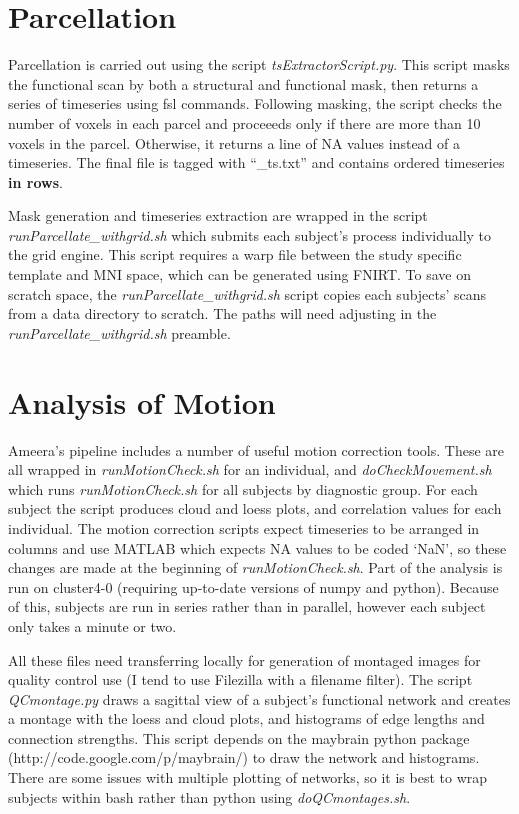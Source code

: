 \documentclass[a4paper,10pt]{article}
\begin{document}
\section{Parcellation}
Parcellation is carried out using the script \textit{tsExtractorScript.py}. This script masks the functional scan by both a structural and functional mask, then returns a series of timeseries using fsl commands. Following masking, the script checks the number of voxels in each parcel and proceeeds only if there are more than 10 voxels in the parcel. Otherwise, it returns a line of NA values instead of a timeseries. The final file is tagged with ``\_ts.txt'' and contains ordered timeseries \textbf{in rows}.

Mask generation and timeseries extraction are wrapped in the script \textit{runParcellate\_withgrid.sh} which submits each subject's process individually to the grid engine. This script requires a warp file between the study specific template and MNI space, which can be generated using FNIRT. To save on scratch space, the \textit{runParcellate\_withgrid.sh} script copies each subjects' scans from a data directory to scratch. The paths will need adjusting in the \textit{runParcellate\_withgrid.sh} preamble.

\section{Analysis of Motion}
Ameera's pipeline includes a number of useful motion correction tools. These are all wrapped in \textit{runMotionCheck.sh} for an individual, and \textit{doCheckMovement.sh} which runs \textit{runMotionCheck.sh} for all subjects by diagnostic group. For each subject the script produces cloud and loess plots, and correlation values for each individual. The motion correction scripts expect timeseries to be arranged in columns and use MATLAB which expects NA values to be coded `NaN', so these changes are made at the beginning of \textit{runMotionCheck.sh}. Part of the analysis is run on cluster4-0 (requiring up-to-date versions of numpy and python). Because of this, subjects are run in series rather than in parallel, however each subject only takes a minute or two.

All these files need transferring locally for generation of montaged images for quality control use (I tend to use Filezilla with a filename filter). The script \textit{QCmontage.py} draws a sagittal view of a subject's functional network and creates a montage with the loess and cloud plots, and histograms of edge lengths and connection strengths. This script depends on the maybrain python package (http://code.google.com/p/maybrain/) to draw the network and histograms. There are some issues with multiple plotting of networks, so it is best to wrap subjects within bash rather than python using \textit{doQCmontages.sh}.
\end{document}
